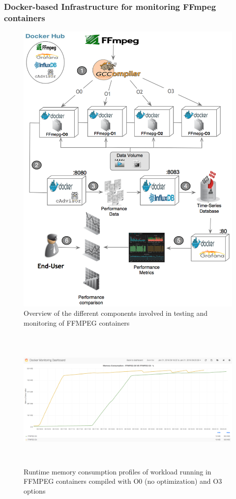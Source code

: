 \subsubsection{Docker-based Infrastructure for monitoring FFmpeg containers}
\begin{figure}[h]
	\centering
	\includegraphics[scale=0.48]{Ressources/infra_ffmpeg.png}
	\caption{Overview of the different components involved in testing and monitoring of FFMPEG containers}
\end{figure}
\begin{figure}
	
	\center
	
	\includegraphics[width=15cm,height=7cm]{Ressources/infra_stats.png}
	\caption{Runtime memory consumption profiles of workload running in FFMPEG containers compiled with O0 (no optimization) and O3 options}
	
	\label{AAA}
	
\end{figure}
